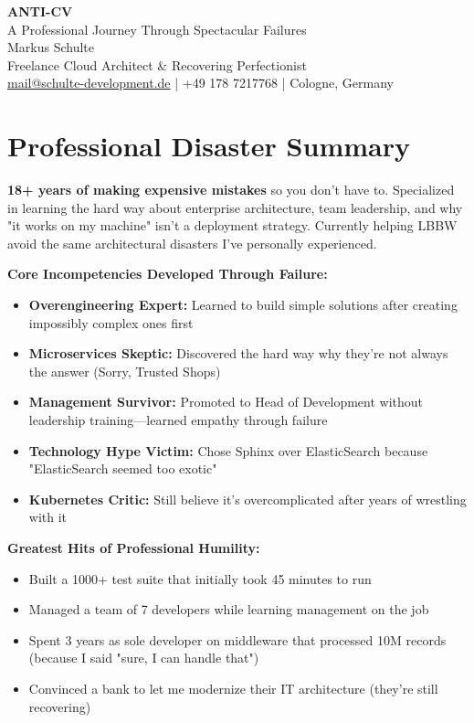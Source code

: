 \documentclass[10pt,a4paper]{article}
\begin{document}
\begin{center}
{\Huge\sffamily\bfseries\color{failred}ANTI-CV}\\[4pt]
{\Large\sffamily\color{lessonblue}A Professional Journey Through Spectacular Failures}\\[8pt]
{\large\sffamily Markus Schulte}\\[2pt]
{\normalsize Freelance Cloud Architect \& Recovering Perfectionist}\\[2pt]
{\small\href{mailto:mail@schulte-development.de}{mail@schulte-development.de} | +49 178 7217768 | Cologne, Germany}
\end{center}

\section{Professional Disaster Summary}

\textbf{18+ years of making expensive mistakes} so you don't have to. Specialized in learning the hard way about enterprise architecture, team leadership, and why "it works on my machine" isn't a deployment strategy. Currently helping LBBW avoid the same architectural disasters I've personally experienced.

\textbf{Core Incompetencies Developed Through Failure:}
\begin{itemize}
\item \textbf{Overengineering Expert:} Learned to build simple solutions after creating impossibly complex ones first
\item \textbf{Microservices Skeptic:} Discovered the hard way why they're not always the answer (Sorry, Trusted Shops)
\item \textbf{Management Survivor:} Promoted to Head of Development without leadership training—learned empathy through failure
\item \textbf{Technology Hype Victim:} Chose Sphinx over ElasticSearch because "ElasticSearch seemed too exotic"
\item \textbf{Kubernetes Critic:} Still believe it's overcomplicated after years of wrestling with it
\end{itemize}

\textbf{Greatest Hits of Professional Humility:}
\begin{itemize}
\item Built a 1000+ test suite that initially took 45 minutes to run
\item Managed a team of 7 developers while learning management on the job
\item Spent 3 years as sole developer on middleware that processed 10M records (because I said "sure, I can handle that")
\item Convinced a bank to let me modernize their IT architecture (they're still recovering)
\end{itemize}
\end{document}
